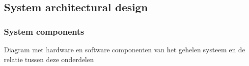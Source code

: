     \newpage
\subsection{System architectural design}


\subsubsection*{System components}
Diagram met hardware en software componenten van het gehelen systeem en de relatie tussen deze onderdelen